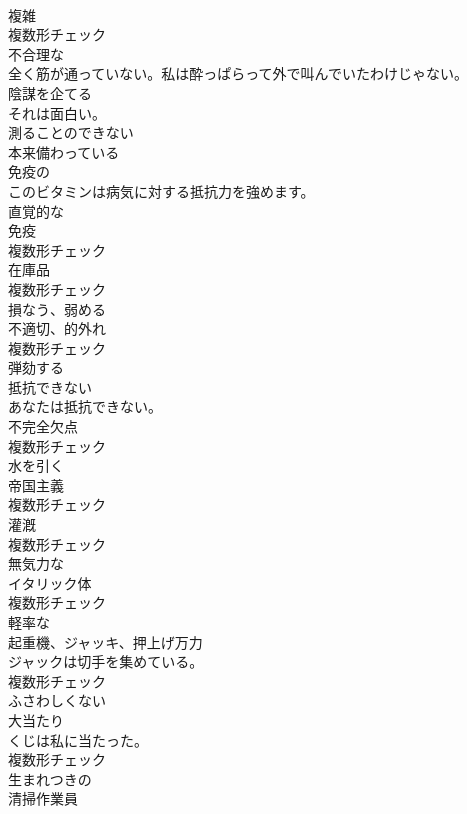 \documentclass[8pt]{extreport}
\begin{document}
\begin{CJK}{UTF8}{min}
\\	[名詞]	複雑	
\\	複数形チェック
\\	[形容詞]	不合理な	
\\	全く筋が通っていない。私は酔っぱらって外で叫んでいたわけじゃない。	
\\	[動詞]	陰謀を企てる	
\\	それは面白い。	
\\	[形容詞]	測ることのできない	
\\	[形容詞]	本来備わっている	
\\	[形容詞]	免疫の	
\\	このビタミンは病気に対する抵抗力を強めます。	
\\	[形容詞]	直覚的な	
\\	[名詞]	免疫	
\\	複数形チェック
\\	[名詞]	在庫品	
\\	複数形チェック
\\	[動詞]	損なう、弱める	
\\	[名詞]	不適切、的外れ	
\\	複数形チェック
\\	[動詞]	弾劾する	
\\	[形容詞]	抵抗できない	
\\	あなたは抵抗できない。	
\\	[名詞]	不完全欠点	
\\	複数形チェック
\\	[動詞]	水を引く	
\\	[名詞]	帝国主義	
\\	複数形チェック
\\	[名詞]	灌漑	
\\	複数形チェック
\\	[形容詞]	無気力な	
\\	[名詞]	イタリック体	
\\	複数形チェック
\\	[形容詞]	軽率な	
\\	[名詞]	起重機、ジャッキ、押上げ万力	
\\	ジャックは切手を集めている。	
\\	複数形チェック
\\	[形容詞]	ふさわしくない	
\\	[名詞]	大当たり	
\\	くじは私に当たった。	
\\	複数形チェック
\\	[形容詞]	生まれつきの	
\\	[名詞]	清掃作業員	

\end{CJK}
\end{document}
